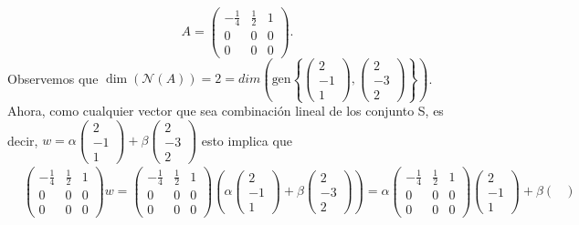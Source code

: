 \documentclass[11pt,letterpaper]{article}
\newcommand{\mcN}{\mathcal{N}}
\newcommand{\gen}{\text{gen}}
\begin{document}
\begin{enumerate}
$$A=\begin{pmatrix}
-\frac{1}{4}&\frac{1}{2}&1\\
0&0&0\\
0&0&0
\end{pmatrix}.$$
Observemos que $\dim \left(\mcN(A) \right)=2=dim\left(\gen\left\{\begin{pmatrix}
2\\
-1\\
1
\end{pmatrix},\begin{pmatrix}
2\\
-3\\
2
\end{pmatrix}\right\}\right)$. Ahora, como cualquier vector que sea combinación lineal de los conjunto S, es decir, $w=\alpha \begin{pmatrix}
2\\
-1\\
1
\end{pmatrix}+\beta\begin{pmatrix}
2\\
-3\\
2
\end{pmatrix}$ esto implica que 
\begin{align*}
&\begin{pmatrix}
-\frac{1}{4}&\frac{1}{2}&1\\
0&0&0\\
0&0&0
\end{pmatrix}w=\begin{pmatrix}
-\frac{1}{4}&\frac{1}{2}&1\\
0&0&0\\
0&0&0
\end{pmatrix}\left(\alpha \begin{pmatrix}
2\\
-1\\
1
\end{pmatrix}+\beta\begin{pmatrix}
2\\
-3\\
2
\end{pmatrix} \right)=\alpha\begin{pmatrix}
-\frac{1}{4}&\frac{1}{2}&1\\
0&0&0\\
0&0&0
\end{pmatrix}\begin{pmatrix}
2\\
-1\\
1
\end{pmatrix}+\beta\begin{pmatrix}

\end{pmatrix}
\end{align*}
\end{enumerate}
\end{document}
